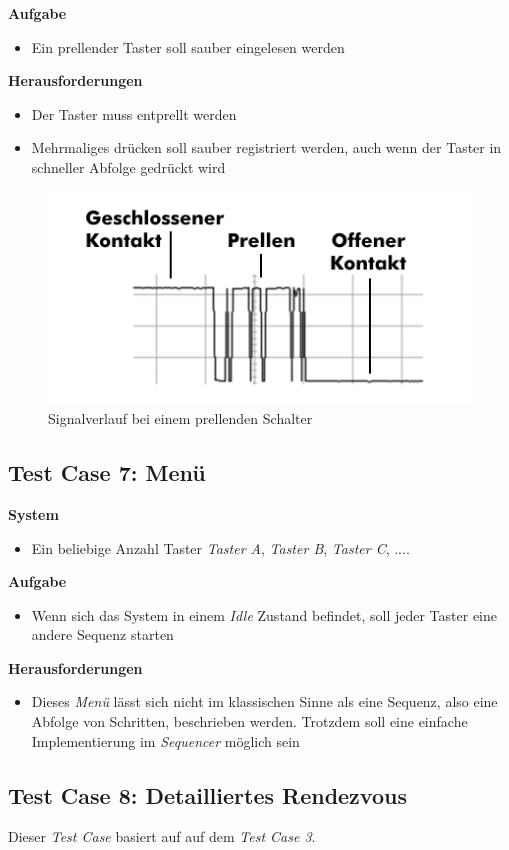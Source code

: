 \textbf{Aufgabe}
\begin{itemize}
\item Ein prellender Taster soll sauber eingelesen werden
\end{itemize}

\textbf{Herausforderungen}
\begin{itemize}
\item Der Taster muss entprellt werden
\item Mehrmaliges drücken soll sauber registriert werden, auch wenn der Taster in schneller Abfolge gedrückt wird
\end{itemize}

\begin{figure}[]
\centering
\includegraphics[angle=0]{images/Testcase06.png}
\caption{Signalverlauf bei einem prellenden Schalter}
\label{Testcase06Picture}
\end{figure}


\subsection{Test Case 7: Menü}
\textbf{System}
\begin{itemize}
\item Ein beliebige Anzahl Taster \textit{Taster A}, \textit{Taster B}, \textit{Taster C}, ....
\end{itemize}

\textbf{Aufgabe}
\begin{itemize}
\item Wenn sich das System in einem \textit{Idle} Zustand befindet, soll jeder Taster eine andere Sequenz starten
\end{itemize}

\textbf{Herausforderungen}
\begin{itemize}
\item Dieses \textit{Menü} lässt sich nicht im klassischen Sinne als eine Sequenz, also eine Abfolge von Schritten, beschrieben werden. Trotzdem soll eine einfache Implementierung im \textit{Sequencer} möglich sein
\end{itemize}


\subsection{Test Case 8: Detailliertes Rendezvous}
Dieser \textit{Test Case} basiert auf auf dem \textit{Test Case 3}.
